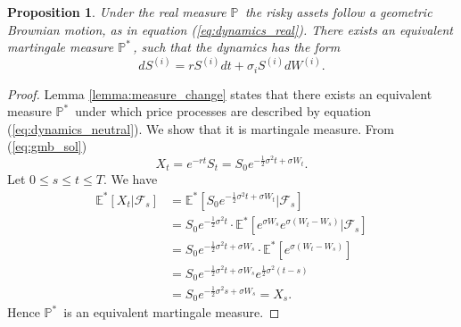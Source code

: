 \documentclass[a4paper,11pt, twoside]{book}
\newtheorem{prop}[thm]{Proposition}
\theoremstyle{definition}
\theoremstyle{remark}
\def\P{{\mathbb{P}}\,}
\def\Em{{\mathbb{E}^*}}
\def\Pm{{\mathbb{P}}^*\,}
\begin{document}
\begin{prop}
\label{prop:rn-dynamics}
 Under the real measure $\P$ the risky assets follow a geometric Brownian motion, as in equation (\ref{eq:dynamics_real}). There exists an equivalent martingale measure $\Pm$, such that the dynamics has the form
 \begin{equation}
  \label{eq:dynamics_neutral}
  dS^{(i)} = r S^{(i)} dt + \sigma_i S^{(i)} dW^{(i)}.
 \end{equation}
\end{prop}
\begin{proof}
 Lemma \ref{lemma:measure_change} states that there exists an equivalent measure $\Pm$ under which price processes are described by equation (\ref{eq:dynamics_neutral}). We show that it is martingale measure.
 From (\ref{eq:gmb_sol})
 \[ X_t = e^{-rt} S_t = S_0 e^{ -\frac{1}{2}\sigma^2 t + \sigma W_t }. \]
 Let $0 \leq s \leq t \leq T$. We have
 \begin{equation*}
  \begin{split}
   \Em[X_t | \mathcal{F}_s] &= \Em[ S_0 e^{ -\frac{1}{2}\sigma^2 t + \sigma W_t } | \mathcal{F}_s] \\
       &= S_0 e^{-\frac{1}{2}\sigma^2 t} \cdot \Em[ e^{  \sigma W_s} e^{ \sigma (W_t - W_s) } | \mathcal{F}_s] \\
       &= S_0 e^{-\frac{1}{2}\sigma^2 t + \sigma W_s} \cdot \Em[ e^{ \sigma (W_t - W_s) }] \\
       &= S_0 e^{-\frac{1}{2}\sigma^2 t + \sigma W_s}  e^{ \frac{1}{2}\sigma^2(t-s) } \\
       &= S_0 e^{-\frac{1}{2}\sigma^2 s + \sigma W_s} = X_s.
  \end{split}
 \end{equation*}
Hence $\Pm$ is an equivalent martingale measure.
\end{proof}
\end{document}
